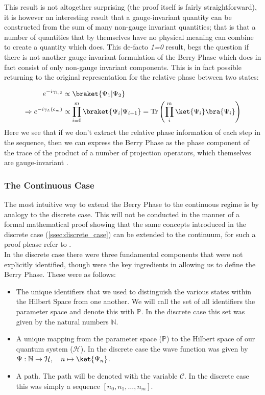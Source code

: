 \documentclass{article}
\DeclareMathOperator\Tr{Tr}
\begin{document}
\vspace{2ex}
This result is not altogether surprising (the proof itself is fairly straightforward), it is however an interesting result that a gauge-invariant quantity can be constructed from the sum of many non-gauge invariant quantities; that is that a number of quantities that by themselves have no physical meaning can combine to create a quantity which does. This de-facto \textit{1=0} result, begs the question if there is not another gauge-invariant formulation of the Berry Phase which does in fact consist of only non-gauge invariant components. This is in fact possible returning to the original representation for the relative phase between two states:

  \begin{align*}
    e^{-i\gamma_{1,2}} &\propto \braket{\Psi_1|\Psi_2}\\
    \Rightarrow e^{-i \gamma_L(c_m)} &\propto  
                         \prod_{i = 0}^{m}  \braket{\Psi_{i}|\Psi_{i+1}} = \Tr \left( \prod_i^m \ket{\Psi_{i}}\bra{\Psi_{i}}\right)
  \end{align*}
  Here we see that if we don't extract the relative phase information of each step in the sequence, then we can express the Berry Phase as the phase component of the trace of the product of a number of projection operators, which themselves are gauge-invariant \cite{Asboth2016}.


\subsubsection{The Continuous Case \label{ssec:continuous_case}}

The most intuitive way to extend the Berry Phase to the continuous regime is by analogy to the discrete case. This will not be conducted in the manner of a formal mathematical proof showing that the same concepts introduced in the discrete case (\ref{ssec:discrete_case}) can be extended to the continuum, for such a proof please refer to \cite{Asboth2016}.\\

In the discrete case there were three fundamental components that were not explicitly identified, though were the key ingredients in allowing us to define the Berry Phase. These were as follows:

\begin{itemize}
  \item The unique identifiers that we used to distinguish the various states within the Hilbert Space from one another. We will call the set of all identifiers the parameter space and denote this with $\mathbb{P}$. In the discrete case this set was given by the natural numbers $\mathbb{N}$.
  \item A unique mapping from the parameter space ($\mathbb{P}$) to the Hilbert space of our quantum system ($\mathcal{H}$). In the discrete case the wave function was given by $\Psi: \mathbb{N} \rightarrow \mathcal{H}, \quad n \mapsto \ket{\Psi_{n}}$. 
  \item A path. The path will be denoted with the variable $\mathcal{C}$. In the discrete case this was simply a sequence $[n_0, n_1, \ldots, n_m]$. 
\end{itemize}
\end{document}
